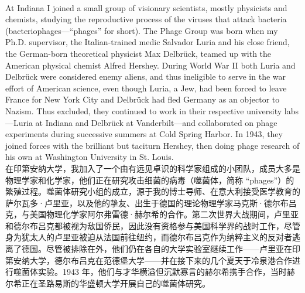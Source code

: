 \documentclass{article}
\begin{document}
\\
At Indiana I joined a small group of visionary scientists, mostly physicists and chemists, studying the reproductive process of the viruses that attack bacteria (bacteriophages—“phages” for short). The Phage Group was born when my Ph.D. supervisor, the Italian-trained medic Salvador Luria and his close friend, the German-born theoretical physicist Max Delbrück, teamed up with the American physical chemist Alfred Hershey. During World War II both Luria and Delbrück were considered enemy aliens, and thus ineligible to serve in the war effort of American science, even though Luria, a Jew, had been forced to leave France for New York City and Delbrück had fled Germany as an objector to Nazism. Thus excluded, they continued to work in their respective university labs—Luria at Indiana and Delbrück at Vanderbilt—and collaborated on phage experiments during successive summers at Cold Spring Harbor. In 1943, they joined forces with the brilliant but taciturn Hershey, then doing phage research of his own at Washington University in St. Louis.\\
在印第安纳大学，我加入了一个由有远见卓识的科学家组成的小团队，成员大多是物理学家和化学家，他们正在研究攻击细菌的病毒（噬菌体，简称 “phages”）的繁殖过程。噬菌体研究小组的成立，源于我的博士导师、在意大利接受医学教育的萨尔瓦多·卢里亚，以及他的挚友、出生于德国的理论物理学家马克斯·德尔布吕克，与美国物理化学家阿尔弗雷德·赫尔希的合作。第二次世界大战期间，卢里亚和德尔布吕克都被视为敌国侨民，因此没有资格参与美国科学界的战时工作，尽管身为犹太人的卢里亚被迫从法国前往纽约，而德尔布吕克作为纳粹主义的反对者逃离了德国。尽管被排除在外，他们仍在各自的大学实验室继续工作——卢里亚在印第安纳大学，德尔布吕克在范德堡大学——并在接下来的几个夏天于冷泉港合作进行噬菌体实验。1943 年，他们与才华横溢但沉默寡言的赫尔希携手合作，当时赫尔希正在圣路易斯的华盛顿大学开展自己的噬菌体研究。 \\
\end{document}
